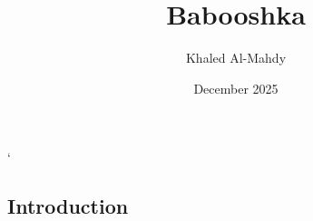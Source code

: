 \documentclass{article}
\title{Babooshka}
\author{Khaled Al-Mahdy}
\date{December 2025}
\begin{document}
`\maketitle

\subsection{Introduction}
\end{document}
